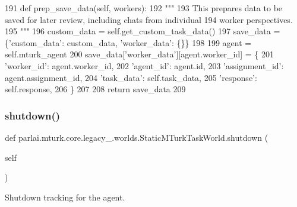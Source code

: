 \begin{DoxyCode}
191     \textcolor{keyword}{def }prep\_save\_data(self, workers):
192         \textcolor{stringliteral}{"""}
193 \textcolor{stringliteral}{        This prepares data to be saved for later review, including chats from individual}
194 \textcolor{stringliteral}{        worker perspectives.}
195 \textcolor{stringliteral}{        """}
196         custom\_data = self.get\_custom\_task\_data()
197         save\_data = \{\textcolor{stringliteral}{'custom\_data'}: custom\_data, \textcolor{stringliteral}{'worker\_data'}: \{\}\}
198 
199         agent = self.mturk\_agent
200         save\_data[\textcolor{stringliteral}{'worker\_data'}][agent.worker\_id] = \{
201             \textcolor{stringliteral}{'worker\_id'}: agent.worker\_id,
202             \textcolor{stringliteral}{'agent\_id'}: agent.id,
203             \textcolor{stringliteral}{'assignment\_id'}: agent.assignment\_id,
204             \textcolor{stringliteral}{'task\_data'}: self.task\_data,
205             \textcolor{stringliteral}{'response'}: self.response,
206         \}
207 
208         \textcolor{keywordflow}{return} save\_data
209 
\end{DoxyCode}
\mbox{\label{classparlai_1_1mturk_1_1core_1_1legacy__2018_1_1worlds_1_1StaticMTurkTaskWorld_a9613b5a6a25c4e6f60bd1da6057cb575}} 
\subsubsection{\texorpdfstring{shutdown()}{shutdown()}}
{\footnotesize\ttfamily def parlai.\+mturk.\+core.\+legacy\+\_.\+worlds.\+Static\+M\+Turk\+Task\+World.\+shutdown (\begin{DoxyParamCaption}\item[{}]{self }\end{DoxyParamCaption})}

\begin{DoxyVerb}Shutdown tracking for the agent.
\end{DoxyVerb}
 

